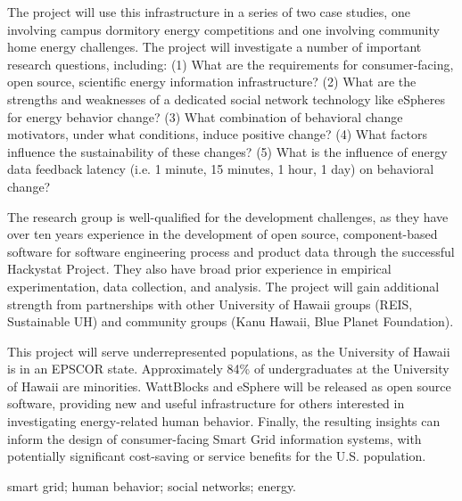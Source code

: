 The project will use this infrastructure in a series of two case studies, one
involving campus dormitory energy competitions and one involving community
home energy challenges.  The project will investigate a number of
important research questions, including: (1) What are the requirements
for consumer-facing, open source, scientific energy information
infrastructure? (2) What are the strengths and weaknesses of a dedicated
social network technology like eSpheres for energy behavior change? (3)
What combination of behavioral change motivators, under what conditions,
induce positive change? (4) What factors influence the sustainability of
these changes? (5) What is the influence of energy data feedback latency
(i.e. 1 minute, 15 minutes, 1 hour, 1 day) on behavioral change? 

The research group is well-qualified for the development challenges, as
they have over ten years experience in the development of open source,
component-based software for software engineering process and product data
through the successful Hackystat Project.  They also have broad prior experience
in empirical experimentation, data collection, and analysis.  The project will
gain additional strength from partnerships with other University of Hawaii
groups (REIS, Sustainable UH) and community groups (Kanu Hawaii, Blue
Planet Foundation).

\medskip 

This project will serve underrepresented populations, as the University of
Hawaii is in an EPSCOR state. Approximately 84\% of undergraduates at the
University of Hawaii are minorities. WattBlocks and eSphere will be
released as open source software, providing new and useful infrastructure
for others interested in investigating energy-related human behavior.
Finally, the resulting insights can inform the design of consumer-facing
Smart Grid information systems, with potentially significant cost-saving or
service benefits for the U.S. population.

\medskip

 smart grid; human behavior; social networks;
energy.




